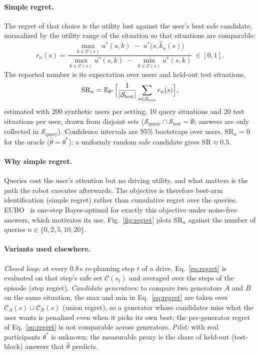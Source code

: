 \paragraph{Simple regret.}
The regret of that choice is the utility lost against the user's best safe candidate,
normalized by the utility range of the situation so that situations are comparable:
\begin{equation}
  r_n(s) = \frac{\max_{k \in \mathcal{C}(s)} u^\ast(s,k) \;-\; u^\ast\bigl(s,\hat k_n(s)\bigr)}
                {\max_{k \in \mathcal{C}(s)} u^\ast(s,k) \;-\; \min_{k \in \mathcal{C}(s)} u^\ast(s,k)}
  \;\in [0,1].
  \label{eq:regret}
\end{equation}
The reported number is its expectation over users and held-out test situations,
\begin{equation}
  \mathrm{SR}_n = \mathbb{E}_{\theta^\ast}\Bigl[\frac{1}{|\mathcal{S}_{\text{test}}|}
  \sum_{s \in \mathcal{S}_{\text{test}}} r_n(s)\Bigr],
  \label{eq:sr}
\end{equation}
estimated with 200 synthetic users per setting, 10 query situations and 20 test situations per user,
drawn from disjoint sets ($\mathcal{S}_{\text{query}} \cap \mathcal{S}_{\text{test}} = \emptyset$;
answers are only collected in $\mathcal{S}_{\text{query}}$).
Confidence intervals are 95\% bootstraps over users.
$\mathrm{SR}_n = 0$ for the oracle ($\hat\theta = \theta^\ast$);
a uniformly random safe candidate gives $\mathrm{SR} \approx 0.5$.

\paragraph{Why simple regret.}
Queries cost the user's attention but no driving utility, and what matters is the path the robot
executes afterwards. The objective is therefore best-arm identification (simple regret) rather
than cumulative regret over the queries. EUBO~\cite{astudillo2023qeubo} is one-step Bayes-optimal
for exactly this objective under noise-free answers, which motivates its use.
Fig.~\ref{fig:regret} plots $\mathrm{SR}_n$ against the number of queries $n \in \{0,2,5,10,20\}$.

\paragraph{Variants used elsewhere.}
\emph{Closed loop:} at every 0.8\,s re-planning step $t$ of a drive, Eq.~\eqref{eq:regret} is evaluated
on that step's safe set $\mathcal{C}(s_t)$ and averaged over the steps of the episode (step regret).
\emph{Candidate generators:} to compare two generators $A$ and $B$ on the same situation, the max and min
in Eq.~\eqref{eq:regret} are taken over $\mathcal{C}_A(s) \cup \mathcal{C}_B(s)$ (union regret), so a generator
whose candidates miss what the user wants is penalized even when it picks its own best;
the per-generator regret of Eq.~\eqref{eq:regret} is not comparable across generators.
\emph{Pilot:} with real participants $\theta^\ast$ is unknown; the measurable proxy is the share of
held-out (test-block) answers that $\hat\theta$ predicts.

